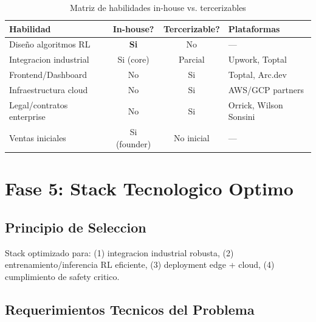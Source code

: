 \documentclass[11pt,a4paper]{article}
\begin{document}
\begin{table}[h]
\centering
\begin{tabular}{p{4cm} c c p{4cm}}
\toprule
\textbf{Habilidad} & \textbf{In-house?} & \textbf{Tercerizable?} & \textbf{Plataformas} \\
\midrule
Diseño algoritmos RL & \textbf{Si} & No & --- \\
Integracion industrial & Si (core) & Parcial & Upwork, Toptal \\
Frontend/Dashboard & No & Si & Toptal, Arc.dev \\
Infraestructura cloud & No & Si & AWS/GCP partners \\
Legal/contratos enterprise & No & Si & Orrick, Wilson Sonsini \\
Ventas iniciales & Si (founder) & No inicial & --- \\
\bottomrule
\end{tabular}
\caption{Matriz de habilidades in-house vs. tercerizables}
\end{table}

\newpage
\section{Fase 5: Stack Tecnologico Optimo}

\subsection{Principio de Seleccion}

\begin{tcolorbox}[colback=grisclaro,colframe=azuloscuro]
Stack optimizado para: (1) integracion industrial robusta, (2) entrenamiento/inferencia RL eficiente, (3) deployment edge + cloud, (4) cumplimiento de safety critico.
\end{tcolorbox}

\subsection{Requerimientos Tecnicos del Problema}
\end{document}
